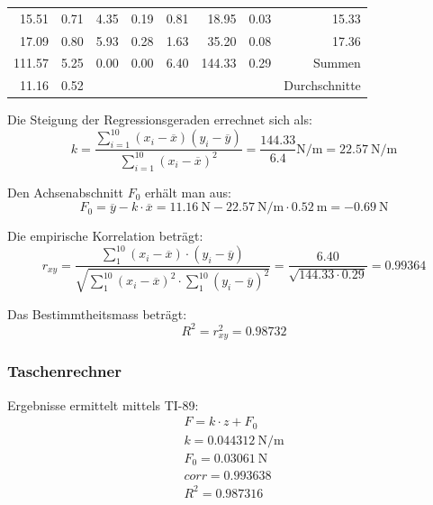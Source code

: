 \begin{tabular}{rrrrrrrr}
              15.51&        0.71&               4.35  &               0.19  &                 0.81                   &        18.95           &         0.03           &  15.33 \\
              17.09&        0.80&               5.93  &               0.28  &                 1.63                   &        35.20           &         0.08           &  17.36 \\
    \midrule
             111.57&        5.25&               0.00  &               0.00  &                 6.40                   &       144.33           &         0.29           & Summen \\
    \midrule
              11.16&        0.52&&&&&& Durchschnitte \\
    \bottomrule
\end{tabular}

Die Steigung der Regressionsgeraden errechnet sich als:
\begin{equation}
    k = \frac{\sum_{i=1}^{10}(x_i-\overline{x})(y_i-\overline{y})}{\sum_{i=1}^{10}(x_i-\overline{x})^2} = \frac{144.33}{6.4} \si{\newton\per\meter} = \SI{22.57}{\newton\per\meter}
\end{equation}

Den Achsenabschnitt $F_0$ erh\"alt man aus:
\begin{equation}
    F_0 = \overline{y} - k \cdot \overline{x} = \SI{11.16}{\newton} - \SI{22.57}{\newton\per\meter} \cdot \SI{0.52}{\meter} = \SI{-0.69}{\newton}
\end{equation}

Die empirische Korrelation betr\"agt:
\begin{equation}
    r_{xy} = \frac{\sum_{1}^{10}(x_i - \overline{x}) \cdot (y_i - \overline{y})}{\sqrt{\sum_{1}^{10}(x_i-\overline{x})^2 \cdot \sum_{1}^{10}(y_i-\overline{y})^2}}
           = \frac{6.40}{\sqrt{144.33 \cdot 0.29}} = 0.99364
\end{equation}

Das Bestimmtheitsmass betr\"agt:
\begin{equation}
    R^{2} = r_{xy}^2 = 0.98732
\end{equation}

\subsubsection{Taschenrechner}
Ergebnisse ermittelt mittels TI-89:
\begin{gather*}
    F = k \cdot z + F_0 \\
    k = \SI{0.044312}{\newton\per\meter} \\
    F_0 = \SI{0.03061}{\newton} \\
    corr = 0.993638 \\
    R^2 = 0.987316
\end{gather*}

